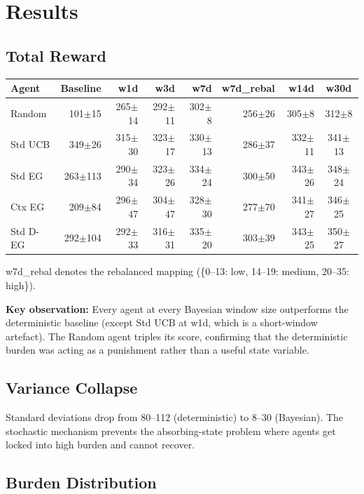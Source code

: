 \documentclass[11pt,a4paper]{article}
\begin{document}
\section{Results}

\subsection{Total Reward}

\begin{center}
\begin{tabular}{l rrrrrrc}
\toprule
Agent & Baseline & w1d & w3d & w7d & w7d\_rebal & w14d & w30d \\
\midrule
Random       & 101$\pm$15 & 265$\pm$14 & 292$\pm$11 & 302$\pm$8 & 256$\pm$26 & 305$\pm$8 & 312$\pm$8 \\
Std UCB      & 349$\pm$26 & 315$\pm$30 & 323$\pm$17 & 330$\pm$13 & 286$\pm$37 & 332$\pm$11 & 341$\pm$13 \\
Std EG       & 263$\pm$113 & 290$\pm$34 & 323$\pm$26 & 334$\pm$24 & 300$\pm$50 & 343$\pm$26 & 348$\pm$24 \\
Ctx EG       & 209$\pm$84 & 296$\pm$47 & 304$\pm$47 & 328$\pm$30 & 277$\pm$70 & 341$\pm$27 & 346$\pm$25 \\
Std D-EG     & 292$\pm$104 & 292$\pm$33 & 316$\pm$31 & 335$\pm$20 & 303$\pm$39 & 343$\pm$25 & 350$\pm$27 \\
\bottomrule
\end{tabular}
\end{center}

\noindent w7d\_rebal denotes the rebalanced mapping
(\{0--13: low, 14--19: medium, 20--35: high\}).

\noindent\textbf{Key observation:} Every agent at every Bayesian window
size outperforms the deterministic baseline (except Std UCB at w1d,
which is a short-window artefact).  The Random agent triples its score,
confirming that the deterministic burden was acting as a punishment
rather than a useful state variable.

\subsection{Variance Collapse}

Standard deviations drop from 80--112 (deterministic) to 8--30
(Bayesian).  The stochastic mechanism prevents the absorbing-state
problem where agents get locked into high burden and cannot recover.

\subsection{Burden Distribution}
\end{document}
